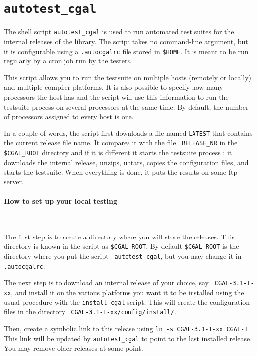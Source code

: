 \section{{\tt autotest\_cgal}}
\label{sec:autotest_cgal}

The shell script {\tt autotest\_cgal} is used to run automated test suites for
the internal releases of the library. The script takes no command-line
argument, but it is configurable using a {\tt .autocgalrc} file stored
in {\tt \$HOME}.
It is meant to be run regularly by a cron job run by the testers.

This script allows you to run the testsuite on multiple hosts (remotely or
locally) and multiple compiler-platforms. It is also possible to specify how
many processors the host has and the script will use this information to run
the testsuite process on several processors at the same time. By default, the
number of processors assigned to every host is one.

In a couple of words, the script first downloads a file named {\tt LATEST}
that contains the current release file name. It compares it with the file {\tt
RELEASE\_NR} in the {\tt \$CGAL\_ROOT} directory and if it is different it
starts the testsuite process : it downloads the internal release, unzips,
untars, copies the configuration files, and starts the testsuite. When
everything is done, it puts the results on some ftp server.

\paragraph{How to set up your local testing} ~

The first step is to create a directory where you will store the releases.
This directory is known in the script as {\tt \$CGAL\_ROOT}. By default
{\tt \$CGAL\_ROOT} is the directory where you put the script {\tt
autotest\_cgal}, but you may change it in {\tt .autocgalrc}.

The next step is to download an internal release of your choice, say {\tt
CGAL-3.1-I-xx}, and install it on the various platforms you want it to be
installed using the usual procedure with the {\tt install\_cgal} script.
This will create the configuration files in the directory {\tt
CGAL-3.1-I-xx/config/install/}.

Then, create a symbolic link to this release using {\tt ln -s CGAL-3.1-I-xx
CGAL-I}. This link will be updated by {\tt autotest\_cgal} to point to the
last installed release.  You may remove older releases at some point.

